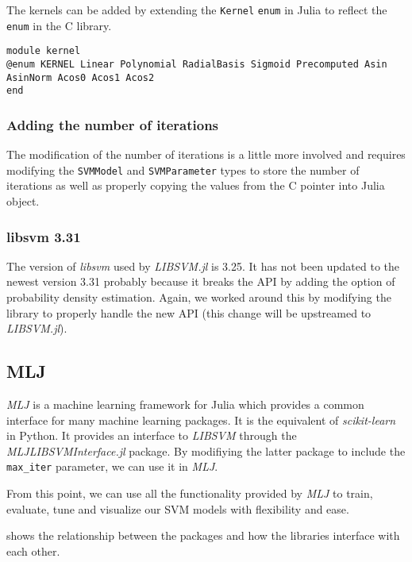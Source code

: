 The kernels can be added by extending the \texttt{Kernel} \texttt{enum} in Julia to reflect the
\texttt{enum} in the C library.
\begin{verbatim}
module kernel
@enum KERNEL Linear Polynomial RadialBasis Sigmoid Precomputed Asin AsinNorm Acos0 Acos1 Acos2
end
\end{verbatim}

\subsubsection{Adding the number of iterations}

The modification of the number of iterations is a little more involved and requires modifying the
\texttt{SVMModel} and \texttt{SVMParameter} types to store the number of iterations as well
as properly copying the values from the C pointer into Julia object.

\subsubsection{libsvm 3.31}

The version of \emph{libsvm} used by \emph{LIBSVM.jl} is 3.25. It has not been updated to the
newest version 3.31 probably because it breaks the API by adding the option of
probability density estimation. Again, we worked around this by modifying the library to properly
handle the new API (this change will be upstreamed to \emph{LIBSVM.jl}). %

\subsection{MLJ}

\emph{MLJ} \cite{blaomMLJJuliaPackage2020} is a machine learning framework for Julia which provides a common interface
for many machine learning packages. It is the equivalent of \emph{scikit-learn} in Python. It provides
an interface to \emph{LIBSVM} through the \emph{MLJLIBSVMInterface.jl} package. By modifiying the latter
package to include the \texttt{max\_iter} parameter, we can use it in \emph{MLJ}.

From this point, we can use all the functionality provided by \emph{MLJ} to train, evaluate,
tune and visualize our SVM models with flexibility and ease.

 shows the relationship between the packages and how the
libraries interface with each other.


